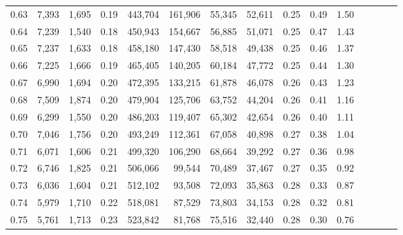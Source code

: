 \begin{tabular}{rrrcrrrrrrrrrrr}
0.63 &   7,393 &  1,695 &                                       0.19 &  443,704 &  161,906 &   55,345 &   52,611 &  0.25 &  0.49 &                         1.50 \\
0.64 &   7,239 &  1,540 &                                       0.18 &  450,943 &  154,667 &   56,885 &   51,071 &  0.25 &  0.47 &                         1.43 \\
0.65 &   7,237 &  1,633 &                                       0.18 &  458,180 &  147,430 &   58,518 &   49,438 &  0.25 &  0.46 &                         1.37 \\
0.66 &   7,225 &  1,666 &                                       0.19 &  465,405 &  140,205 &   60,184 &   47,772 &  0.25 &  0.44 &                         1.30 \\
0.67 &   6,990 &  1,694 &                                       0.20 &  472,395 &  133,215 &   61,878 &   46,078 &  0.26 &  0.43 &                         1.23 \\
0.68 &   7,509 &  1,874 &                                       0.20 &  479,904 &  125,706 &   63,752 &   44,204 &  0.26 &  0.41 &                         1.16 \\
0.69 &   6,299 &  1,550 &                                       0.20 &  486,203 &  119,407 &   65,302 &   42,654 &  0.26 &  0.40 &                         1.11 \\
0.70 &   7,046 &  1,756 &                                       0.20 &  493,249 &  112,361 &   67,058 &   40,898 &  0.27 &  0.38 &                         1.04 \\
0.71 &   6,071 &  1,606 &                                       0.21 &  499,320 &  106,290 &   68,664 &   39,292 &  0.27 &  0.36 &                         0.98 \\
0.72 &   6,746 &  1,825 &                                       0.21 &  506,066 &   99,544 &   70,489 &   37,467 &  0.27 &  0.35 &                         0.92 \\
0.73 &   6,036 &  1,604 &                                       0.21 &  512,102 &   93,508 &   72,093 &   35,863 &  0.28 &  0.33 &                         0.87 \\
0.74 &   5,979 &  1,710 &                                       0.22 &  518,081 &   87,529 &   73,803 &   34,153 &  0.28 &  0.32 &                         0.81 \\
0.75 &   5,761 &  1,713 &                                       0.23 &  523,842 &   81,768 &   75,516 &   32,440 &  0.28 &  0.30 &                         0.76 \\

\end{tabular}
